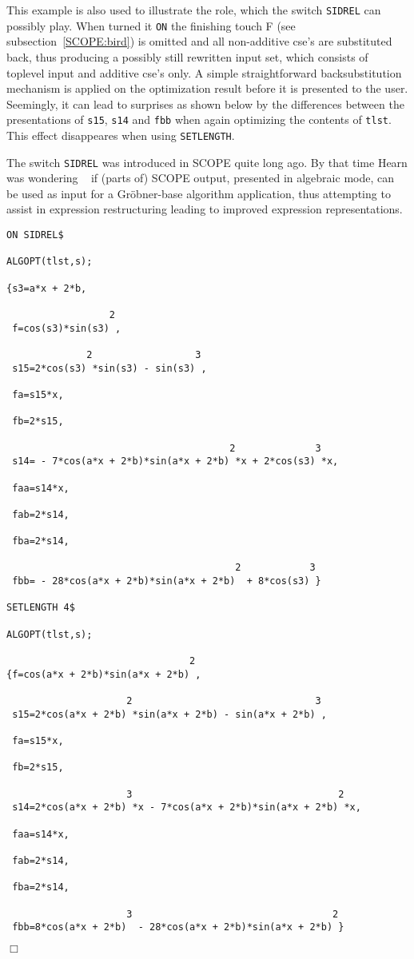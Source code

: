 This example is also used to illustrate the role, which the switch {\tt SIDREL}
can possibly play. When turned it {\tt ON} the finishing touch F (see 
subsection~\ref{SCOPE:bird}) is omitted and all non-additive cse's
are substituted back, thus producing a possibly still rewritten input set,
which consists of toplevel input and additive cse's only. A simple
straightforward backsubstitution mechanism is applied on the optimization
result before it is presented to the user. Seemingly, it can lead to surprises
as shown below by the differences between the presentations of {\tt s15}, 
{\tt s14} and {\tt fbb} when again optimizing the contents of {\tt tlst}.
This effect disappeares when using {\tt SETLENGTH}.

The switch {\tt SIDREL} was introduced in SCOPE quite long ago. By that
time Hearn was wondering ~\cite{Hearn:85,Hearn:86} if (parts of) SCOPE output, 
presented in algebraic mode, can be used as input for a Gr\"{o}bner-base
algorithm application, thus attempting to assist in expression restructuring 
leading to improved expression representations. 
{\small
\begin{verbatim}
ON SIDREL$

ALGOPT(tlst,s);

{s3=a*x + 2*b,

                  2
 f=cos(s3)*sin(s3) ,

              2                  3
 s15=2*cos(s3) *sin(s3) - sin(s3) ,

 fa=s15*x,

 fb=2*s15,

                                       2              3
 s14= - 7*cos(a*x + 2*b)*sin(a*x + 2*b) *x + 2*cos(s3) *x,

 faa=s14*x,

 fab=2*s14,

 fba=2*s14,

                                        2            3
 fbb= - 28*cos(a*x + 2*b)*sin(a*x + 2*b)  + 8*cos(s3) }

SETLENGTH 4$

ALGOPT(tlst,s);

                                2
{f=cos(a*x + 2*b)*sin(a*x + 2*b) ,

                     2                                3
 s15=2*cos(a*x + 2*b) *sin(a*x + 2*b) - sin(a*x + 2*b) ,

 fa=s15*x,

 fb=2*s15,

                     3                                    2
 s14=2*cos(a*x + 2*b) *x - 7*cos(a*x + 2*b)*sin(a*x + 2*b) *x,

 faa=s14*x,

 fab=2*s14,

 fba=2*s14,

                     3                                   2
 fbb=8*cos(a*x + 2*b)  - 28*cos(a*x + 2*b)*sin(a*x + 2*b) }
\end{verbatim}}
{\small
\begin{flushright}
$\Box$
\end{flushright}}
\newpage

